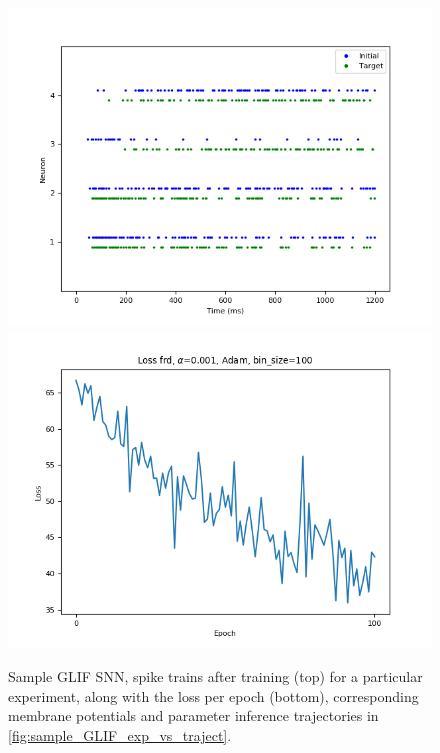 \documentclass[mphil,deptreport,ianc]{infthesis} %
\begin{document}
\begin{figure}
    \centering
    \vspace{-0.1in}
    \includegraphics[width=0.9\linewidth]{figures/samples/GLIF/12-09_16-14-54-627/spike_trains_train_iter_100.png}
    \vspace{-0.1in}
    \includegraphics[width=0.9\linewidth]{figures/samples/GLIF/12-09_16-14-54-627/plot_loss_test12-09_16-16-45-54312-09_16-16-45-543.png}
    \vspace{-0.1in}
    \caption{Sample GLIF SNN, spike trains after training (top) for a particular experiment, along with the loss per epoch (bottom), corresponding membrane potentials and parameter inference trajectories in \ref{fig:sample_GLIF_exp_vs_traject}.}
    \label{fig:sample_GLIF_exp}
\end{figure}
\end{document}
